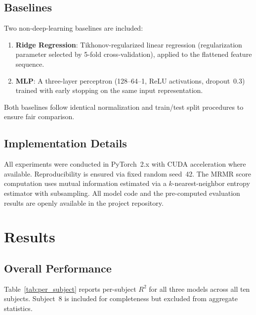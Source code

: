 \documentclass[journal]{IEEEtran}
\begin{document}
\subsection{Baselines}

Two non-deep-learning baselines are included:
\begin{enumerate}
  \item \textbf{Ridge Regression}: Tikhonov-regularized linear regression
    (regularization parameter selected by 5-fold cross-validation),
    applied to the flattened feature sequence.
  \item \textbf{MLP}: A three-layer perceptron (128--64--1, ReLU activations,
    dropout~0.3) trained with early stopping on the same input
    representation.
\end{enumerate}
Both baselines follow identical normalization and train/test split
procedures to ensure fair comparison.

\subsection{Implementation Details}

All experiments were conducted in PyTorch~2.x with CUDA acceleration where
available.  Reproducibility is ensured via fixed random seed~42.  The MRMR
score computation uses mutual information estimated via a $k$-nearest-neighbor
entropy estimator with subsampling.  All model code and the pre-computed
evaluation results are openly available in the project repository.

\section{Results}
\label{sec:results}

\subsection{Overall Performance}

Table~\ref{tab:per_subject} reports per-subject $R^2$ for all three models
across all ten subjects.  Subject~8 is included for completeness but
excluded from aggregate statistics.
\end{document}
